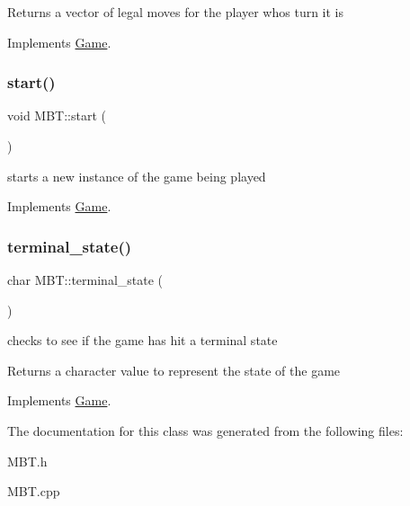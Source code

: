 \begin{DoxyReturn}{Returns}
a vector of legal moves for the player whos turn it is 
\end{DoxyReturn}


Implements \hyperlink{class_game_a205fc7dd195bc398138cc188aad8bc38}{Game}.

\mbox{\label{class_m_b_t_aa951382dfec95e214ba1e63189977d8f}} 
\subsubsection{\texorpdfstring{start()}{start()}}
{\footnotesize\ttfamily void M\+B\+T\+::start (\begin{DoxyParamCaption}{ }\end{DoxyParamCaption})\hspace{0.3cm}{\ttfamily [virtual]}}



starts a new instance of the game being played 



Implements \hyperlink{class_game_add988158041df85337995e36f06756aa}{Game}.

\mbox{\label{class_m_b_t_ac0b5fc7a538c643ce69a678407fa9f56}} 
\subsubsection{\texorpdfstring{terminal\+\_\+state()}{terminal\_state()}}
{\footnotesize\ttfamily char M\+B\+T\+::terminal\+\_\+state (\begin{DoxyParamCaption}{ }\end{DoxyParamCaption})\hspace{0.3cm}{\ttfamily [virtual]}}



checks to see if the game has hit a terminal state 

\begin{DoxyReturn}{Returns}
a character value to represent the state of the game 
\end{DoxyReturn}


Implements \hyperlink{class_game_ac7cbe36964272dd7dcd7e68fafaf24cc}{Game}.



The documentation for this class was generated from the following files\+:\begin{DoxyCompactItemize}
\item 
M\+B\+T.\+h\item 
M\+B\+T.\+cpp\end{DoxyCompactItemize}
